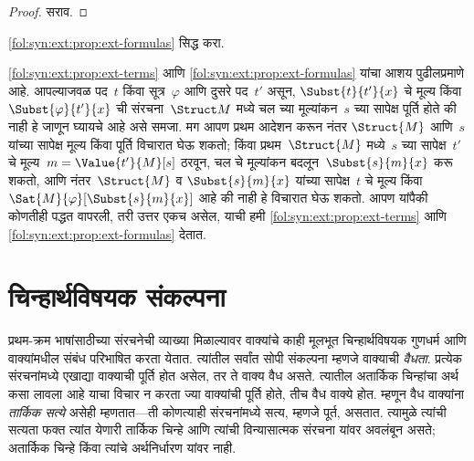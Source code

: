 \begin{proof}
सराव.
\end{proof}

\begin{prob}
\ref{fol:syn:ext:prop:ext-formulas} सिद्ध करा.
\end{prob}

\begin{explain}
  \ref{fol:syn:ext:prop:ext-terms} आणि \ref{fol:syn:ext:prop:ext-formulas} यांचा
  आशय पुढीलप्रमाणे आहे. आपल्याजवळ पद~$t$ किंवा सूत्र~$\varphi$ आणि
  दुसरे पद~$t'$ असून, $\Subst{t}{t'}{x}$ चे मूल्य किंवा
  $\Subst{\varphi}{t'}{x}$ ची संरचना~$\Struct M$ मध्ये
  चल च्या मूल्यांकन~$s$ च्या सापेक्ष पूर्ति होते की नाही हे
  जाणून घ्यायचे आहे असे समजा. मग आपण प्रथम आदेशन करून नंतर
  $\Struct{M}$ आणि~$s$ यांच्या सापेक्ष मूल्य किंवा पूर्ति विचारात घेऊ
  शकतो; किंवा प्रथम~$\Struct{M}$ मध्ये~$s$ च्या सापेक्ष~$t'$ चे
  मूल्य~$m = \Value{t'}{M}[s]$ ठरवून, चल चे मूल्यांकन
  बदलून~$\Subst{s}{m}{x}$ करू शकतो, आणि नंतर~$\Struct{M}$ व
  $\Subst{s}{m}{x}$ यांच्या सापेक्ष~$t$ चे मूल्य किंवा
  $\Sat{M}{\varphi}[\Subst{s}{m}{x}]$ आहे की नाही हे विचारात घेऊ शकतो.
  आपण यांपैकी कोणतीही पद्धत वापरली, तरी उत्तर एकच असेल, याची हमी
  \ref{fol:syn:ext:prop:ext-terms} आणि \ref{fol:syn:ext:prop:ext-formulas}
  देतात.
\end{explain}











\section{चिन्हार्थविषयक संकल्पना}\label{fol:syn:sem:sec}

\begin{explain}
प्रथम-क्रम भाषांसाठीच्या संरचनेची व्याख्या मिळाल्यावर वाक्यांचे
काही मूलभूत चिन्हार्थविषयक गुणधर्म आणि वाक्यांमधील संबंध परिभाषित करता
येतात. त्यांतील सर्वांत सोपी संकल्पना म्हणजे वाक्याची \emph{वैधता}.
प्रत्येक संरचनांमध्ये एखाद्या वाक्याची पूर्ति होत असेल, तर ते
वाक्य वैध असते. त्यातील अतार्किक चिन्हांचा अर्थ कसा लावला आहे याचा
विचार न करता ज्या वाक्यांची पूर्ति होते, तीच वैध वाक्ये होत. म्हणून वैध
वाक्यांना \emph{तार्किक सत्ये} असेही म्हणतात---ती कोणत्याही
संरचनांमध्ये सत्य, म्हणजे पूर्त, असतात. त्यामुळे त्यांची सत्यता
फक्त त्यांत येणारी तार्किक चिन्हे आणि त्यांची विन्यासात्मक संरचना
यांवर अवलंबून असते; अतार्किक चिन्हे किंवा त्यांचे अर्थनिर्धारण यांवर नाही.
\end{explain}

